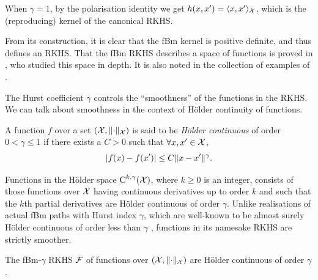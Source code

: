 \begin{remark}
  When $\gamma=1$, by the polarisation identity we get $h(x,x') = \langle x,x'\rangle_{\mathcal X}$, which is the (reproducing) kernel of the canonical RKHS.
\end{remark}

From its construction, it is clear that the fBm kernel is positive definite, and thus defines an RKHS.
That the fBm RKHS describes a space of functions is proved in \citet{cohen2002}, who studied this space in depth. 
It is also noted in the collection of examples of \citet[pp.71 \& 319]{berlinet2011reproducing}.

The Hurst coefficient $\gamma$ controls the ``smoothness'' of the functions in the RKHS. 
We can talk about smoothness in the context of Hölder continuity of functions.

\begin{definition}
  A function $f$ over a set $({\mathcal X}, \lVert\cdot\rVert_{\mathcal X})$ is said to be \emph{Hölder continuous} of order $0 <\gamma\leq 1$ if there exists a $C>0$ such that $\forall x,x'\in{\mathcal X}$,
  \[
    \vert f(x) - f(x') \vert \leq C \lVert x-x'\rVert^\gamma.
  \]
\end{definition}

Functions in the Hölder space $\text{C}^{k,\gamma}({\mathcal X})$, where $k\geq 0$ is an integer, consists of those functions over ${\mathcal X}$ having continuous derivatives up to order $k$ and such that the $k$th partial derivatives are Hölder continuous of order $\gamma$.
Unlike realisations of actual fBm paths with Hurst index $\gamma$, which are well-known to be almost surely Hölder continuous of order less than $\gamma$ \citep[Theorem 4.1.1]{embrechts2002selfsimilar}, functions in its namesake RKHS are strictly smoother.


\begin{claim}
  The fBm-$\gamma$ RKHS ${\mathcal F}$ of functions over $({\mathcal X}, \lVert\cdot\rVert_{\mathcal X})$ are Hölder continuous of order $\gamma$.
\end{claim}

